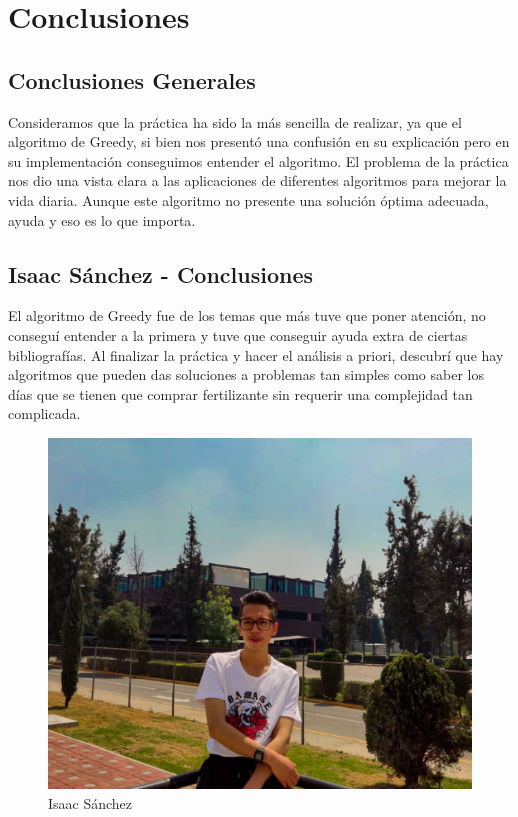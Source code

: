 \chapter{Conclusiones}

\section{Conclusiones Generales}
    
    Consideramos que la práctica ha sido la más sencilla de realizar, ya que el algoritmo de Greedy, si bien nos presentó una confusión en su explicación pero en su implementación conseguimos entender el algoritmo. El problema de la práctica nos dio una vista clara a las aplicaciones de diferentes algoritmos para mejorar la vida diaria. Aunque este algoritmo no presente una solución óptima adecuada, ayuda y eso es lo que importa.

\newpage
\section{Isaac Sánchez - Conclusiones}
    El algoritmo de Greedy fue de los temas que más tuve que poner atención, no conseguí entender a la primera y tuve que conseguir ayuda extra de ciertas bibliografías. Al finalizar la práctica y hacer el análisis a priori, descubrí que hay algoritmos que pueden das soluciones a problemas tan simples como saber los días que se tienen que comprar fertilizante sin requerir una complejidad tan complicada. 
    \begin{figure}[htp!]
            \centering
            \includegraphics[width=1 \textwidth]{Images/Fotos_Alumnos/274612600_2528992867236334_6677874837890685705_n.jpg}  
            \caption{Isaac Sánchez}
            \label{fig:my_label1}
        \end{figure}
    


